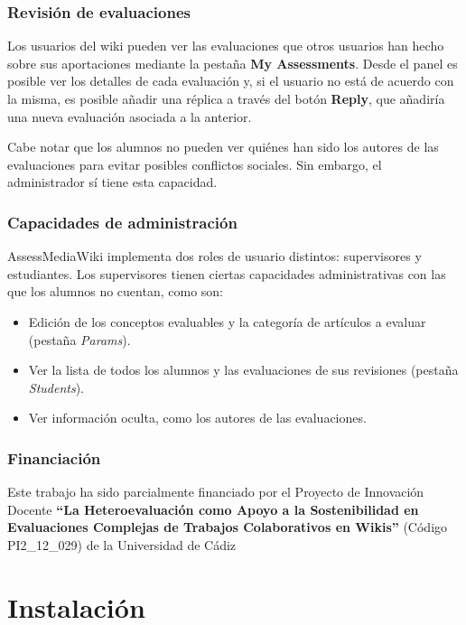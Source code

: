 \documentclass[11pt]{article}
\begin{document}
\subsubsection{Revisión de evaluaciones}

Los usuarios del wiki pueden ver las evaluaciones que otros usuarios han hecho
sobre sus aportaciones mediante la pestaña \textbf{My Assessments}. Desde el
panel es posible ver los detalles de cada evaluación y, si el usuario no está de
acuerdo con la misma, es posible añadir una réplica a través del botón
\textbf{Reply}, que añadiría una nueva evaluación asociada a la anterior.

Cabe notar que los alumnos no pueden ver quiénes han sido los autores de las
evaluaciones para evitar posibles conflictos sociales. Sin embargo, el
administrador sí tiene esta capacidad.

\subsubsection{Capacidades de administración}

AssessMediaWiki implementa dos roles de usuario distintos: supervisores y
estudiantes. Los supervisores tienen ciertas capacidades administrativas con las
que los alumnos no cuentan, como son:

\begin{itemize}
\item Edición de los conceptos evaluables y la categoría de artículos a evaluar
  (pestaña \textit{Params}).
\item Ver la lista de todos los alumnos y las evaluaciones de sus revisiones
  (pestaña \textit{Students}).
\item Ver información oculta, como los autores de las evaluaciones.
\end{itemize}


\subsubsection{Financiación}

Este trabajo ha sido parcialmente financiado por el Proyecto de Innovación
Docente \textbf{``La Heteroevaluación como Apoyo a la Sostenibilidad en Evaluaciones
Complejas de Trabajos Colaborativos en Wikis''} (Código PI2\_12\_029) de la
Universidad de Cádiz

\section{Instalación}
\end{document}
